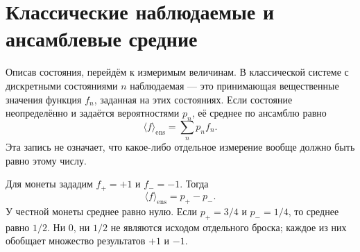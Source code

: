 \begin{classroomqa}
\end{classroomqa}

\section{Классические наблюдаемые и ансамблевые средние}

Описав состояния, перейдём к измеримым величинам. В классической системе с дискретными состояниями \(n\) наблюдаемая — это принимающая вещественные значения функция \(f_n\), заданная на этих состояниях. Если состояние неопределённо и задаётся вероятностями \(p_n\), её среднее по ансамблю равно
\begin{equation}
  \langle f\rangle_{\mathrm{ens}}
  =\sum_n p_n f_n.
  \label{eq:l02-classical-expectation}
\end{equation}
Эта запись не означает, что какое-либо отдельное измерение вообще должно быть равно этому числу.

Для монеты зададим \(f_+=+1\) и \(f_-=-1\). Тогда
\begin{equation}
  \langle f\rangle_{\mathrm{ens}}
  =p_+-p_-.
  \label{eq:l02-coin-expectation}
\end{equation}
У честной монеты среднее равно нулю. Если \(p_+=3/4\) и \(p_-=1/4\), то среднее равно \(1/2\). Ни \(0\), ни \(1/2\) не являются исходом отдельного броска; каждое из них обобщает множество результатов \(+1\) и \(-1\).

\begin{classroomqa}
\end{classroomqa}

